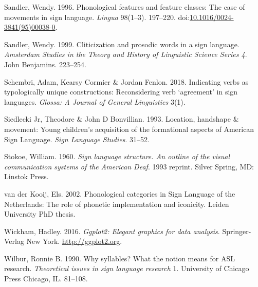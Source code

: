 \leavevmode\hypertarget{ref-Sandler:1996}{}%
Sandler, Wendy. 1996. Phonological features and feature classes: The
case of movements in sign language. \emph{Lingua} 98(1--3). 197--220.
doi:\href{https://doi.org/10.1016/0024-3841(95)00038-0}{10.1016/0024-3841(95)00038-0}.

\leavevmode\hypertarget{ref-Sandier:1999}{}%
Sandler, Wendy. 1999. Cliticization and prosodic words in a sign
language. \emph{Amsterdam Studies in the Theory and History of
Linguistic Science Series 4}. John Benjamins. 223--254.

\leavevmode\hypertarget{ref-Schembri:2018}{}%
Schembri, Adam, Kearsy Cormier \& Jordan Fenlon. 2018. Indicating verbs
as typologically unique constructions: Reconsidering verb `agreement' in
sign languages. \emph{Glossa: A Journal of General Linguistics} 3(1).

\leavevmode\hypertarget{ref-Siedlecki:1993}{}%
Siedlecki Jr, Theodore \& John D Bonvillian. 1993. Location, handshape
\& movement: Young children's acquisition of the formational aspects of
American Sign Language. \emph{Sign Language Studies}. 31--52.

\leavevmode\hypertarget{ref-Stokoe:1960}{}%
Stokoe, William. 1960. \emph{Sign language structure. An outline of the
visual communication systems of the American Deaf}. 1993 reprint. Silver
Spring, MD: Linstok Press.

\leavevmode\hypertarget{ref-vanderKooij:2002}{}%
van der Kooij, Els. 2002. Phonological categories in Sign Language of
the Netherlands: The role of phonetic implementation and iconicity.
Leiden University PhD thesis.

\leavevmode\hypertarget{ref-Wickham:2016}{}%
Wickham, Hadley. 2016. \emph{Ggplot2: Elegant graphics for data
analysis}. Springer-Verlag New York. \url{http://ggplot2.org}.

\leavevmode\hypertarget{ref-Wilbur:1990}{}%
Wilbur, Ronnie B. 1990. Why syllables? What the notion means for ASL
research. \emph{Theoretical issues in sign language research} 1.
University of Chicago Press Chicago, IL. 81--108.
